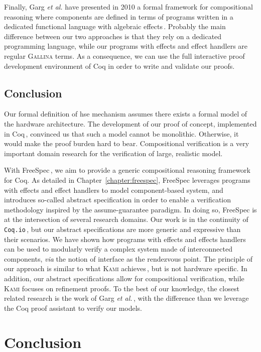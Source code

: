 Finally, Garg \emph{et al.} have presented in 2010 a formal framework for
compositional reasoning where components are defined in terms of programs
written in a dedicated functional language with algebraic
effects\,\cite{garg2010compositional}.
%
Probably the main difference between our two approaches is that they rely on a
dedicated programming language, while our programs with effects and effect
handlers are regular {\scshape Gallina} terms.
%
As a consequence, we can use the full interactive proof development environment
of Coq in order to write and validate our proofs.

\subsection{Conclusion}
\label{subsec:sota:compconclu}

Our formal definition of \ac{hse} mechanism assumes there exists a formal model
of the hardware architecture.
%
The development of our proof of concept, implemented in
Coq\,\cite{letan2016speccertcode}, convinced us that such a model cannot be
monolithic.
%
Otherwise, it would make the proof burden hard to bear.
%
Compositional verification is a very important domain research for the
verification of large, realistic model.

With FreeSpec\,\cite{letan2018freespeccode}, we aim to provide a generic
compositional reasoning framework for Coq.
%
As detailed in Chapter~\ref{chapter:freespec}, FreeSpec leverages programs with
effects and effect handlers to model component-based system, and introduces
so-called abstract specification in order to enable a verification methodology
inspired by the assume-guarantee paradigm.
%
In doing so, FreeSpec is at the intersection of several research domains.
%
Our work is in the continuity of \texttt{Coq.io}\,\cite{claret2015coqio}, but
our abstract specifications are more generic and expressive than their
scenarios.
%
We have shown how programs with effects and effects handlers can be used to
modularly verify a complex system made of interconnected components, \emph{via}
the notion of interface as the rendezvous point.
%
The principle of our approach is similar to what {\scshape Kami}
achieves\,\cite{choi2017kami}, but is not hardware specific.
%
In addition, our abstract specifications allow for compositional verification,
while {\scshape Kami} focuses on refinement proofs.
%
To the best of our knowledge, the closest related research is the work of Garg
\emph{et al.}\,\cite{garg2010compositional}, with the difference than we
leverage the Coq proof assistant to verify our models.

\section{Conclusion}
\label{sec:sota:conclusion}
